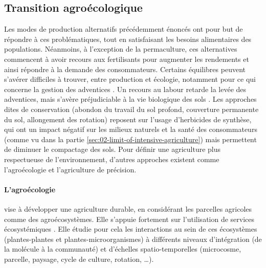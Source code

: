 \documentclass[../thesis.tex]{subfiles}
\begin{document}
    \newpage
    \subsection{Transition agroécologique}
    
    Les modes de production alternatifs précédemment énoncés ont pour but de répondre à ces problématiques, tout en satisfaisant les besoins alimentaires des populations. Néanmoins, à l'exception de la permaculture, ces alternatives commencent à avoir recours aux fertilisants pour augmenter les rendements et ainsi répondre à la demande des consommateurs. Certains équilibres peuvent s'avérer difficiles à trouver, entre production et écologie, notamment pour ce qui concerne la gestion des adventices \cite{bajwa2019sustainable}. Un recours au labour retarde la levée des adventices, mais s'avère préjudiciable à la vie biologique des sols \cite{lemtiri2016crop}. Les approches dites de conservation (abondon du travail du sol profond, couverture permanente du sol, allongement des rotation) reposent sur l'usage d'herbicides de synthèse, qui ont un impact négatif sur les milieux naturels et la santé des consommateurs (comme vu dans la partie \ref{sec:02-limit-of-intensive-agriculture}) mais permettent de diminuer le compactage des sols. Pour définir une agriculture plus respectueuse de l'environnement, d'autres approches existent comme l'agroécologie et l'agriculture de précision.
    
    
    \paragraph{L'agroécologie} vise à développer une agriculture durable, en considérant les parcelles agricoles comme des agroécosystèmes. Elle s'appuie fortement sur l'utilisation de services écosystémiques \cite{altieri1999ecological, Lamarque2014, perrette2018services, lefloch2018premiere, altieri2018agroecology, haan2021designing}. Elle étudie pour cela les interactions au sein de ces écosystèmes (plantes-plantes et plantes-microorganismes) à différents niveaux d'intégration (de la molécule à la communauté) et d'échelles spatio-temporelles (microcosme, parcelle, paysage, cycle de culture, rotation, \dots).
    
\end{document}
